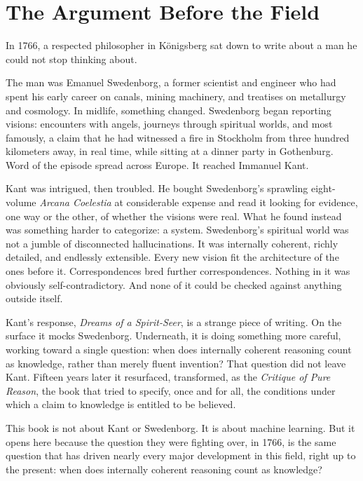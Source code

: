 \chapter*{The Argument Before the Field}

In 1766, a respected philosopher in Königsberg sat down to write about a man he could not stop thinking about.

The man was Emanuel Swedenborg, a former scientist and engineer who had spent his early career on canals, mining machinery, and treatises on metallurgy and cosmology. In midlife, something changed. Swedenborg began reporting visions: encounters with angels, journeys through spiritual worlds, and most famously, a claim that he had witnessed a fire in Stockholm from three hundred kilometers away, in real time, while sitting at a dinner party in Gothenburg. Word of the episode spread across Europe. It reached Immanuel Kant.

Kant was intrigued, then troubled. He bought Swedenborg's sprawling eight-volume \emph{Arcana Coelestia} at considerable expense and read it looking for evidence, one way or the other, of whether the visions were real. What he found instead was something harder to categorize: a system. Swedenborg's spiritual world was not a jumble of disconnected hallucinations. It was internally coherent, richly detailed, and endlessly extensible. Every new vision fit the architecture of the ones before it. Correspondences bred further correspondences. Nothing in it was obviously self-contradictory. And none of it could be checked against anything outside itself.

Kant's response, \emph{Dreams of a Spirit-Seer}, is a strange piece of writing. On the surface it mocks Swedenborg. Underneath, it is doing something more careful, working toward a single question: when does internally coherent reasoning count as knowledge, rather than merely fluent invention? That question did not leave Kant. Fifteen years later it resurfaced, transformed, as the \emph{Critique of Pure Reason}, the book that tried to specify, once and for all, the conditions under which a claim to knowledge is entitled to be believed.

This book is not about Kant or Swedenborg. It is about machine learning. But it opens here because the question they were fighting over, in 1766, is the same question that has driven nearly every major development in this field, right up to the present: when does internally coherent reasoning count as knowledge?

